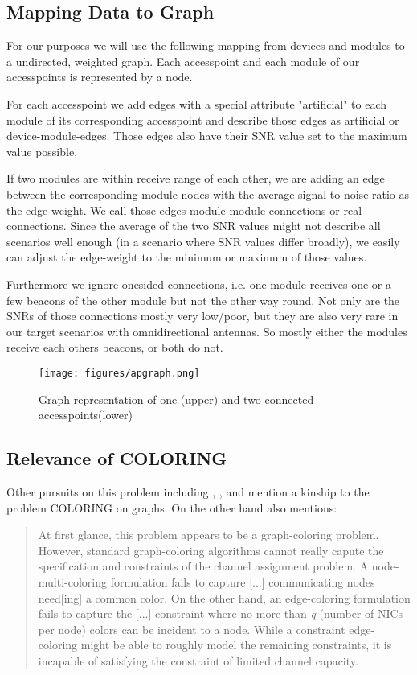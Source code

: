   \subsection{Mapping Data to Graph}
    For our purposes we will use the following mapping from devices and modules to a undirected, weighted graph.
    Each accesspoint and each module of our accesspoints is represented by a node.
    
    For each accesspoint we add edges with a special attribute "artificial" 
    to each module of its corresponding accesspoint and describe those edges as artificial or device-module-edges.
    Those edges also have their SNR value set to the maximum value possible. 
    
    If two modules are within receive range of each other, 
    we are adding an edge between the corresponding module nodes with the average signal-to-noise ratio as the edge-weight.
    We call those edges module-module connections or real connections.
    Since the average of the two SNR values might not describe all scenarios well enough (in a scenario where SNR values differ broadly),
    we easily can adjust the edge-weight to the minimum or maximum of those values.
    
    Furthermore we ignore onesided connections, i.e. one module receives one or a few beacons of the other module but not the other way round.
    Not only are the SNRs of those connections mostly very low/poor, but they are also very rare in our target scenarios with omnidirectional antennas.
    So mostly either the modules receive each others beacons, or both do not.
    
    \begin{figure}[th!]
      \centering
      \texttt{[image: figures/apgraph.png]}
      \caption{Graph representation of one (upper) and two connected accesspoints(lower)}
      \label{fig:apgraph}
    \end{figure}
    
  \subsection{Relevance of COLORING}
    Other pursuits on this problem including \cite{BFS-CA}, \cite{CTA}, \cite{caa_tricky} and \cite{katzela} mention a kinship to the problem COLORING on graphs.
    On the other hand \cite{caa_tricky} also mentions:
    
    \begin{quote}
      At first glance, this problem appears to be a graph-coloring problem. However, standard graph-coloring algorithms cannot really capute the specification and constraints 
      of the channel assignment problem. A node-multi-coloring formulation fails to capture [...] communicating nodes need[ing] a common color. On the other hand,
      an edge-coloring formulation fails to capture the [...] constraint where no more than \textit{q} (number of NICs per node) colors can be incident to a node.
      While a constraint edge-coloring might be able to roughly model the remaining constraints, it is incapable of satisfying the constraint of limited channel capacity.
    \end{quote}
    
